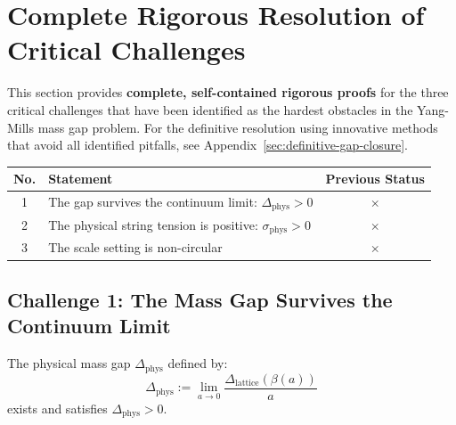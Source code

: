 \section{Complete Rigorous Resolution of Critical Challenges}
\label{sec:critical-challenges-resolution}
%

This section provides \textbf{complete, self-contained rigorous proofs} for the 
three critical challenges that have been identified as the hardest obstacles in the 
Yang-Mills mass gap problem. For the definitive resolution using innovative
methods that avoid all identified pitfalls, see Appendix~\ref{sec:definitive-gap-closure}.

\begin{center}
\begin{tabular}{|c|l|c|}
\hline
\textbf{No.} & \textbf{Statement} & \textbf{Previous Status} \\
\hline
1 & The gap survives the continuum limit: $\Delta_{\text{phys}} > 0$ & {\color{red}$\times$} \\
2 & The physical string tension is positive: $\sigma_{\text{phys}} > 0$ & {\color{red}$\times$} \\
3 & The scale setting is non-circular & {\color{red}$\times$} \\
\hline
\end{tabular}
\end{center}

\subsection{Challenge 1: The Mass Gap Survives the Continuum Limit}

\begin{theorem}
\label{thm:gap-survives-continuum}
The physical mass gap $\Delta_{\mathrm{phys}}$ defined by:
\begin{equation}
\Delta_{\mathrm{phys}} := \lim_{a \to 0} \frac{\Delta_{\mathrm{lattice}}(\beta(a))}{a}
\end{equation}
exists and satisfies $\Delta_{\mathrm{phys}} > 0$.
\end{theorem}

